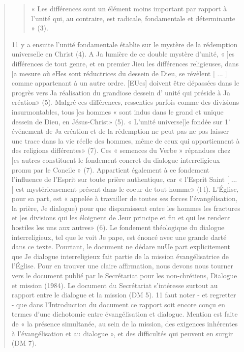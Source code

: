 \begin{quote}
\begin{quote}
« Les différences
sont un élément moins important par rapport à l'unité
qui, au contraire, est radicale, fondamentale et déterminante »
(3). 
\end{quote}
 11 y a ensuite l'unité fondamentale établie sur le mystère
de la rédemption universelle en Christ (4). A Ja lumière de ce
double mystère d'unité, « ]es différences de tout genre, et en
premier Jieu les différences religieuses, dans ]a mesure où eHes
sont réductrices du dessein de Dieu, se révèlent [ ... ] comme
appartenant à un autre ordre. [EUes] doivent être dépassées
dans le progrès vers Ja réalisation du grandiose dessein d' unité
qui préside à Ja création» (5). Malgré ces différences, ressenties
parfois comme des divisions insurmontables, tous ]es
hommes « sont indus dans le grand et unique dessein de Dieu,
en Jésus-Christ» (5). « L'unité universe]]e fondée sur 1' événement
de Ja création et de la rédemption ne peut pas ne pas laisser
une trace dans la vie réelle des hommes, même de ceux qui
appartiennent à des religions différentes» (7). Ces « semences
du Verbe » répandues chez ]es autres constituent le fondement
concret du dialogue interreligieux promu par le Concile » (7).
Appartient également à ce fondement l'influence de l'Esprit
sur toute prière authentique, car « l'Esprit Saint [ ... ] est mystérieusement
présent dans le coeur de tout homme» (l l). L'Église,
pour sa part, est « appelée à travailler de toutes ses forces
l'évangélisation, la prière, Je dialogue) pour que disparaissent
entre les hommes les fractures et ]es divisions qui les éloignent
de Jeur principe et fin et qui les rendent hostiles les uns aux
autres» (6).
Le fondement théologique du dialogue interreligieux, tel
que le voit Je pape, est énoncé avec une grande darté dans ce
texte. Pourtant, le document ne dédare nuUe part explicitement
que Je dialogue interreligieux fait partie de la mission
évangélisatrice de l'Église.  
Pour en trouver une claire affirmation,
nous devons nous tourner vers le document publié par
le Secrétariat pour les non-chrétiens, Dialogue et mission
(1984). Le document du Secrétariat s'intéresse surtout au rapport
entre le dialogue et la mission (DM 5). 11 faut noter - et regretter
- que dans l'Introduction du document ce rapport soit
encore conçu en termes d'une dichotomie entre évangélisation
et dialogue. Mention est faite de « la présence simultanée, au
sein de la mission, des exigences inhérentes à l'évangélisation
et au dialogue », et des difficultés qui peuvent en surgir (DM 7).

\end{quote}
